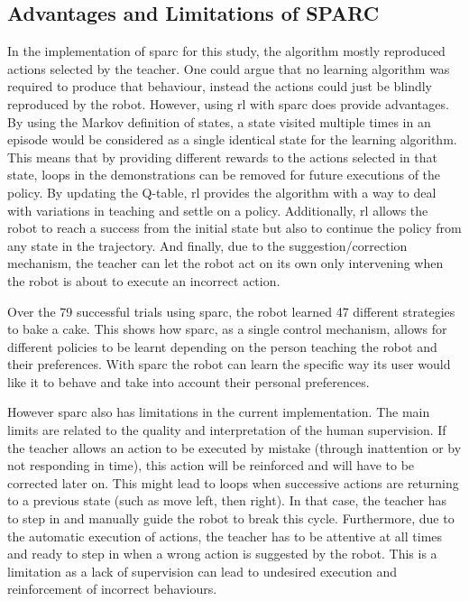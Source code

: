 \subsection{Advantages and Limitations of SPARC}

In the implementation of \gls{sparc} for this study, the algorithm mostly reproduced actions selected by the teacher. One could argue that no learning algorithm was required to produce that behaviour, instead the actions could just be blindly reproduced by the robot. However, using \gls{rl} with \gls{sparc} does provide advantages. By using the Markov definition of states, a state visited multiple times in an episode would be considered as a single identical state for the learning algorithm. This means that by providing different rewards to the actions selected in that state, loops in the demonstrations can be removed for future executions of the policy. By updating the Q-table, \gls{rl} provides the algorithm with a way to deal with variations in teaching and settle on a policy. Additionally, \gls{rl} allows the robot to reach a success from the initial state but also to continue the policy from any state in the trajectory. And finally, due to the suggestion/correction mechanism, the teacher can let the robot act on its own only intervening when the robot is about to execute an incorrect action. 

Over the 79 successful trials using \gls{sparc}, the robot learned 47 different strategies to bake a cake. This shows how \gls{sparc}, as a single control mechanism, allows for different policies to be learnt depending on the person teaching the robot and their preferences. With \gls{sparc} the robot can learn the specific way its user would like it to behave and take into account their personal preferences.

However \gls{sparc} also has limitations in the current implementation. The main limits are related to the quality and interpretation of the human supervision. If the teacher allows an action to be executed by mistake (through inattention or by not responding in time), this action will be reinforced and will have to be corrected later on. This might lead to loops when successive actions are returning to a previous state (such as move left, then right). In that case, the teacher has to step in and manually guide the robot to break this cycle. Furthermore, due to the automatic execution of actions, the teacher has to be attentive at all times and ready to step in when a wrong action is suggested by the robot. This is a limitation as a lack of supervision can lead to undesired execution and reinforcement of incorrect behaviours.

